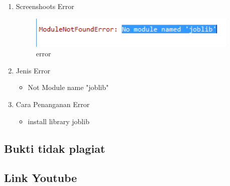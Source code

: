 	\begin{enumerate}
		\item Screenshoots Error
			\begin{figure}[H]
				\begin{center}
				 \includegraphics[width=10cm]{figures/1174076/figures1/error_1.PNG}
				 \caption{error}	
				\end{center}
			\end{figure}
			
		\item Jenis Error
			\begin{itemize}
				\item Not Module name "joblib"
			\end{itemize}
			
			\item Cara Penanganan Error
			\begin{itemize}
				\item install library joblib
			\end{itemize}
			
	\end{enumerate}
	
\subsection{Bukti tidak plagiat}

\subsection{Link Youtube}

	